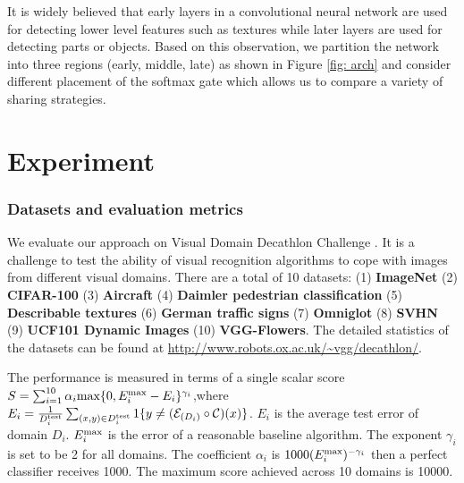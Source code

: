 \documentclass[letterpaper]{article} \usepackage{aaai19}  \usepackage{times}  \usepackage{helvet}  \usepackage{courier}  \usepackage{url}  \usepackage{graphicx}  \usepackage{amssymb}
\begin{document}
It is widely believed that early layers in a convolutional neural network are used for detecting lower level features such as textures while later layers are used for detecting parts or objects. Based on this observation, we partition the network into three regions (early, middle, late) as shown in Figure \ref{fig: arch} and consider different placement of the softmax gate which allows us to compare a variety of sharing strategies.

\section{Experiment}

\subsubsection{Datasets and evaluation metrics}
We evaluate our approach on Visual Domain Decathlon Challenge \cite{rebuffi2017learning}. It is a challenge to test the ability of visual recognition algorithms to cope with images from different visual domains. There are a total of 10 datasets: (1) \textbf{ImageNet} (2) \textbf{CIFAR-100} (3) \textbf{Aircraft} (4) \textbf{Daimler pedestrian classification} (5) \textbf{Describable textures} (6) \textbf{German traffic signs} (7) \textbf{Omniglot} (8) \textbf{SVHN} (9) \textbf{UCF101 Dynamic Images} (10) 
\textbf{VGG-Flowers}. The detailed statistics of the datasets can be found at \url{http://www.robots.ox.ac.uk/~vgg/decathlon/}.

The performance is measured in terms of a single scalar score $S=\sum_{i=1}^{10}\alpha_i \textnormal{max}\{0, E_i^{\textnormal{max}}-E_i\}^{\gamma_i}$,where $   E_i = \frac{1}{D_i^{\textnormal{test}}}\sum_{(x,y) \in D_i^{\textnormal{test}}} 1\{y \neq  (\mathcal{E}_{(D_i)} \circ \mathcal{C})(x)\}$.
$E_i$ is the average test error of domain $D_i$. $E_i^{\textnormal{max}}$ is the error of a reasonable baseline algorithm. The exponent $\gamma_i$ is set to be 2 for all domains. The coefficient $\alpha_{i}$ is  $1000(E_i^{\textnormal{max}})^{-\gamma_i}$ then a perfect classifier receives 1000. The maximum score achieved across 10 domains is 10000.
\end{document}
